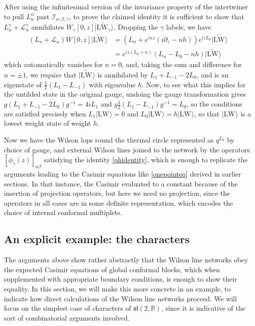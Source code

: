 \documentclass[12pt]{article}
\newcommand{\RR}{\mathbb{R}}
\newcommand{\lie}[1]{\mathfrak{#1}}
\newcommand{\intertwine}[3]{\mathcal{I}_{#1;#2,#3}}
\newcommand{\lw}[1]{|\text{LW}_{#1}\rangle}
\begin{document}
After using the infinitesimal version of the invariance property of the intertwiner to pull $L_n^\alpha$ past $\intertwine{\alpha}{\beta}{\gamma}$, to prove the claimed identity it is sufficient to show that $L_n^\gamma+\mathcal{L}_n^\gamma$ annihilates $W_\gamma[0,z]\widetilde{\lw{\gamma}}$. Dropping the $\gamma$ labels, we have
\begin{align}
	(L_n+\mathcal{L}_n)W[0,z]\widetilde{\lw{}} &= (L_n+e^{inz}(i\partial_z-nh))e^{izL_0}\widetilde{\lw{}}\nonumber \\
	&=e^{iz (L_0+n)}(L_n-L_0-nh)\widetilde{\lw{}}
\end{align}
which automatically vanishes for $n=0$, and, taking the sum and difference for $n=\pm 1$, we require that $\widetilde{\lw{}}$ is annihilated by $L_1+L_{-1}-2L_0$, and is an eigenstate of $\frac{1}{2}(L_1-L_{-1})$ with eigenvalue $h$. Now, to see what this implies for the untilded state in the original gauge, undoing the gauge transformation gives $g(L_1+L_{-1}-2L_0)g^{-1}=4iL_1$ and $g\frac{1}{2}(L_1-L_{-1})g^{-1}=L_0$, so the conditions are satisfied precisely when $L_1\lw{}=0$ and $L_0\lw{}=h\lw{}$, so that $\lw{}$ is a lowest weight state of weight $h$.

Now we have the Wilson lops round the thermal circle represented as $q^{L_0}$ by choice of gauge, and external Wilson lines joined to the network by the operators $[\phi_\gamma(z)]_{\alpha\beta}$ satisfying the identity \cref{phidentity}, which is enough to replicate the arguments leading to the Casimir equations like \cref{onepointeq} derived in earlier sections. In that instance, the Casimir evaluated to a constant because of the insertion of projection operators, but here we need no projection, since the operators in all cases are in some definite representation, which encodes the choice of internal conformal multiplets.

\subsection{An explicit example: the characters}

The arguments above show rather abstractly that the Wilson line networks obey the expected Casimir equations of global conformal blocks, which when supplemented with appropriate boundary conditions, is enough to show their equality. In this section, we will make this more concrete in an example, to indicate how direct calculations of the Wilson line networks proceed. We will focus on the simplest case of characters of $\lie{sl}(2,\RR)$, since it is indicative of the sort of combinatorial arguments involved.
\end{document}
